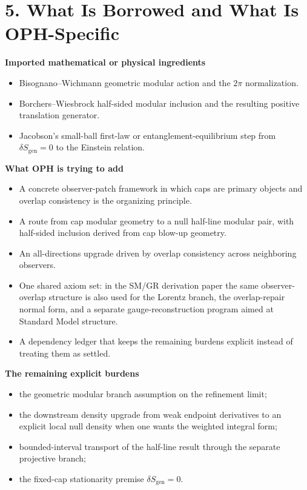 \documentclass[10pt]{article}
\begin{document}
\section*{5. What Is Borrowed and What Is OPH-Specific}

\textbf{Imported mathematical or physical ingredients}
\begin{itemize}[leftmargin=1.8em]
\item Bisognano--Wichmann geometric modular action and the \(2\pi\) normalization.
\item Borchers--Wiesbrock half-sided modular inclusion and the resulting positive translation generator.
\item Jacobson's small-ball first-law or entanglement-equilibrium step from \(\delta S_{\mathrm{gen}}=0\) to the Einstein relation.
\end{itemize}

\textbf{What OPH is trying to add}
\begin{itemize}[leftmargin=1.8em]
\item A concrete observer-patch framework in which caps are primary objects and overlap consistency is the organizing principle.
\item A route from cap modular geometry to a null half-line modular pair, with half-sided inclusion derived from cap blow-up geometry.
\item An all-directions upgrade driven by overlap consistency across neighboring observers.
\item One shared axiom set: in the SM/GR derivation paper the same observer-overlap structure is also used for the Lorentz branch, the overlap-repair normal form, and a separate gauge-reconstruction program aimed at Standard Model structure.
\item A dependency ledger that keeps the remaining burdens explicit instead of treating them as settled.
\end{itemize}

\textbf{The remaining explicit burdens}
\begin{itemize}[leftmargin=1.8em]
\item the geometric modular branch assumption on the refinement limit;
\item the downstream density upgrade from weak endpoint derivatives to an explicit local null density when one wants the weighted integral form;
\item bounded-interval transport of the half-line result through the separate projective branch;
\item the fixed-cap stationarity premise \(\delta S_{\mathrm{gen}}=0\).
\end{itemize}
\end{document}
